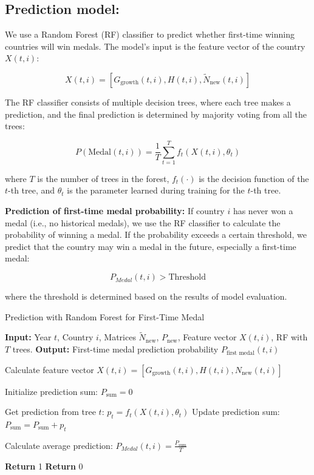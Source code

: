 \documentclass{mcmthesis}
\begin{document}
	
	
	
	

\subsection{Prediction model:}  
We use a Random Forest (RF) classifier to predict whether first-time winning countries will win medals. The model’s input is the feature vector of the country \( X(t,i) \):

\[
X(t,i) = [G_{\text{growth}}(t,i), H(t,i), \tilde{N}_{\text{new}}(t,i)]
\]

The RF classifier consists of multiple decision trees, where each tree makes a prediction, and the final prediction is determined by majority voting from all the trees:

\[
P(\text{Medal}(t,i)) = \frac{1}{T} \sum_{t=1}^{T} f_t(X(t,i), \theta_t)
\]

where \( T \) is the number of trees in the forest, \( f_t(\cdot) \) is the decision function of the \( t \)-th tree, and \( \theta_t \) is the parameter learned during training for the \( t \)-th tree.

\textbf{Prediction of first-time medal probability:}  
If country \( i \) has never won a medal (i.e., no historical medals), we use the RF classifier to calculate the probability of winning a medal. If the probability exceeds a certain threshold, we predict that the country may win a medal in the future, especially a first-time medal:

\[
P_{Medal}(t,i) > \text{Threshold}
\]

where the threshold is determined based on the results of model evaluation.
\begin{algorithm}
	\caption{Prediction with Random Forest for First-Time Medal}
	\begin{algorithmic}[1]
		\State \textbf{Input:} Year \( t \), Country \( i \), Matrices \( \tilde{N}_{\text{new}} \), \( P_{\text{new}} \), Feature vector \( X(t,i) \), RF with \( T \) trees.
		\State \textbf{Output:} First-time medal prediction probability \( P_{\text{first medal}}(t,i) \)
		
		\State Calculate feature vector \( X(t,i) = [G_{\text{growth}}(t,i), H(t,i), N_{\text{new}}(t,i)] \)
		
		\State Initialize prediction sum: \( P_{\text{sum}} = 0 \)
		
		\State Get prediction from tree \( t \): \( p_t = f_t(X(t,i), \theta_t) \)
		\State Update prediction sum: \( P_{\text{sum}} = P_{\text{sum}} + p_t \)
		\EndFor
		
		\State Calculate average prediction: \( P_{Medal}(t,i)  = \frac{P_{\text{sum}}}{T} \)
		
		\State \textbf{Return} 1 
		\Else
		\State \textbf{Return} 0 
		\EndIf
	\end{algorithmic}
\end{algorithm}
\end{document}
